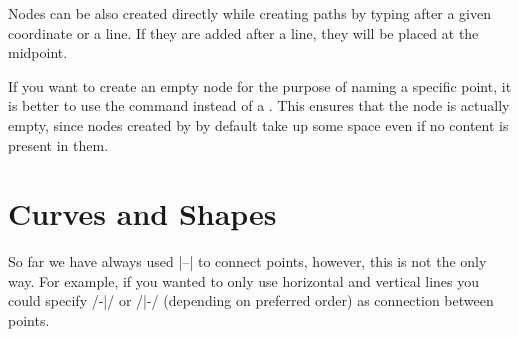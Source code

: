 Nodes can be also created directly while creating paths by typing 
after a given coordinate or a line. If they are added after a line, they will
be placed at the midpoint.
\begin{example}
\end{example}

If you want to create an empty node for the purpose of naming a specific point,
it is better to use the  command instead of a . This
ensures that the node is actually empty, since nodes created by  by
default take up some space even if no content is present in them.
\begin{example}
\end{example}

\section{Curves and Shapes}

So far we have always used \ltx|--| to connect points, however,
this is not the only way. For example, if you wanted to only use horizontal and
vertical lines you could specify \ltx/-|/ or \ltx/|-/ (depending on preferred
order) as connection between points.
\begin{example}
\end{example}

